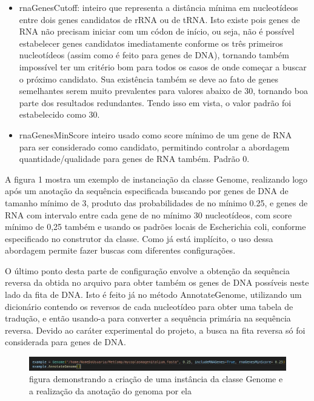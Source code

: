 \documentclass[brazilian,12pt,a4paper,final]{article}
\begin{document}
\begin{itemize}
		\item rnaGenesCutoff: inteiro que representa a distância mínima em nucleotídeos entre dois genes candidatos de rRNA ou de tRNA. Isto existe pois genes de RNA
							  não precisam iniciar com um códon de início, ou seja, não é possível estabelecer genes candidatos imediatamente conforme 
							  os três primeiros nucleotídeos (assim como é feito para genes de DNA), tornando também impossível ter um critério bom para 
							  todos os casos de onde começar a buscar o próximo candidato. Sua existência também se deve ao fato de genes semelhantes
							  serem muito prevalentes para valores abaixo de 30, tornando boa parte dos resultados redundantes. Tendo isso em vista, o valor
							  padrão foi estabelecido como 30.
							  
		\item rnaGenesMinScore inteiro usado como score mínimo de um gene de RNA para ser considerado como candidato, permitindo controlar a abordagem
								quantidade/qualidade para genes de RNA também. Padrão 0.
	\end{itemize}
								
	
		A figura 1 mostra um exemplo de instanciação da classe Genome, realizando logo após um anotação da sequência especificada buscando por genes de DNA 
		de tamanho mínimo de 3, produto das probabilidades de no mínimo 0.25, e genes de RNA com intervalo entre cada gene de no mínimo 30 nucleotídeos, com 
		score mínimo de 0,25 também e usando os padrões locais de Escherichia coli, conforme especificado no construtor da classe. Como já está implícito,
		o uso dessa abordagem permite fazer buscas com diferentes configurações.
		
		\vspace{0.5cm}
		
		O último ponto desta parte de configuração envolve a obtenção da sequência reversa da obtida no arquivo para obter também os genes de DNA possíveis
		 neste lado da fita de DNA. Isto é feito já no método AnnotateGenome, utilizando um dicionário contendo os reversos de cada nucleotídeo para obter uma
		 tabela de tradução, e então usando-a para converter a sequência primária na sequência reversa. Devido ao caráter experimental do projeto, a busca na fita
		 reversa só foi considerada para genes de DNA.
		 
		
	\begin{figure}[hbtp]
		\begin{center}
			\includegraphics[]{Instanciacao.jpg}
			\caption{figura demonstrando a criação de uma instância da classe Genome e a realização da anotação do genoma por ela}
			\label{fig}
		\end{center}
	\end{figure}
\end{document}
